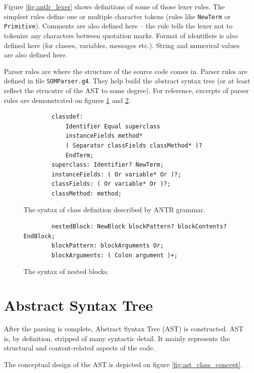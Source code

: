 \documentclass[thesis=M,english]{FITthesis}[2019/12/23]
\begin{document}
Figure \ref{fig:antlr_lexer} shows definitions of some of those lexer rules. The simplest rules define one or multiple character
tokens (rules like \texttt{NewTerm} or \texttt{Primitive}). Comments are also defined here -- the rule tells the lexer not to tokenize
any characters between quotation marks. Format of identifiers is also defined here (for classes, variables, messages etc.). String
and numerical values are also defined here.

Parser rules are where the structure of the source code comes in. Parser rules are defined in file \texttt{SOMParser.g4}. They
help build the abstract syntax tree (or at least reflect the strucutre of the AST to some degree). For reference, excerpts of
parser rules are demonstrated on figures \ref{fig:antlr_classdef} and \ref{fig:antlr_blocks}.

\begin{figure}[h!]
	\centering
	\begin{verbatim}
		classdef:
		    Identifier Equal superclass
		    instanceFields method*
		    ( Separator classFields classMethod* )?
		    EndTerm;
		superclass: Identifier? NewTerm;
		instanceFields: ( Or variable* Or )?;
		classFields: ( Or variable* Or )?;
		classMethod: method;
	\end{verbatim}
	\caption{The syntax of class definition described by ANTR grammar.}
	\label{fig:antlr_classdef}
\end{figure}

\begin{figure}
	\centering
	\begin{verbatim}
		nestedBlock: NewBlock blockPattern? blockContents? EndBlock;
		blockPattern: blockArguments Or;
		blockArguments: ( Colon argument )+;
	\end{verbatim}
	\caption{The syntax of nested blocks.}
	\label{fig:antlr_blocks}
\end{figure}


\section{Abstract Syntax Tree}
After the parsing is complete, Abstract Syntax Tree (AST) is constructed. AST is, by definition, stripped of many syntactic detail.
It mainly represents the structural and content-related aspects of the code.

The conceptual design of the AST is depicted on figure \ref{fig:ast_class_concept}.
\end{document}
